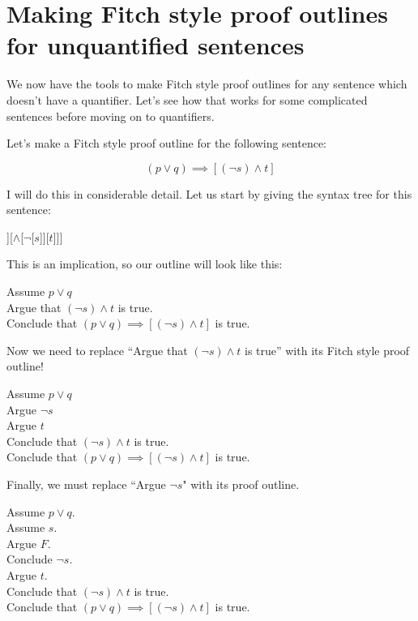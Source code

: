 \section{Making Fitch style proof outlines for unquantified sentences }

We now have the tools to make Fitch style proof outlines for any sentence which doesn't have a quantifier.  Let's see how that works for some complicated sentences before moving on to quantifiers.

Let's make a Fitch style proof outline for the following sentence:

$$
(p \vee q) \implies [(\neg s) \wedge t]
$$

I will do this in considerable detail.  Let us start by giving the syntax tree for this sentence:

\begin{center}
	\begin{forest}
			[$\implies$[$\vee$[$p$][$q$]][$\wedge$[$\neg$[$s$]][$t$]]]
		\end{forest}
\end{center}

This is an implication, so our outline will look like this:

\begin{fitch*}
	\textrm{Assume $p \vee q$}\\
	\fa \textrm{Argue that $(\neg s) \wedge t$ is true.}\\
	\textrm{Conclude that $(p \vee q) \implies [(\neg s) \wedge t]$ is true.}
\end{fitch*}

 

Now we need to replace ``Argue that $(\neg s) \wedge t$ is true'' with its Fitch style proof outline!

\begin{fitch*}
	\textrm{Assume $p \vee q$}\\
	\fa \textrm{Argue $\neg s$}\\
	\fa \textrm{Argue $t$}\\
	\fa \textrm{Conclude that $(\neg s) \wedge t$ is true.}\\
	\textrm{Conclude that $(p \vee q) \implies [(\neg s) \wedge t]$ is true.}
\end{fitch*}


Finally, we must replace ``Argue $\neg s$" with its proof outline.

\begin{fitch*}
	\textrm{Assume $p \vee q$.}\\
	\fa \textrm{Assume $s$.}\\
	\fa \fa \textrm{Argue $F$.}\\
	\fa \textrm{Conclude $\neg s$.}\\
	\fa \textrm{Argue $t$.}\\
	\fa \textrm{Conclude that $(\neg s) \wedge t$ is true.}\\
	\textrm{Conclude that $(p \vee q) \implies [(\neg s) \wedge t]$ is true.}
\end{fitch*}

